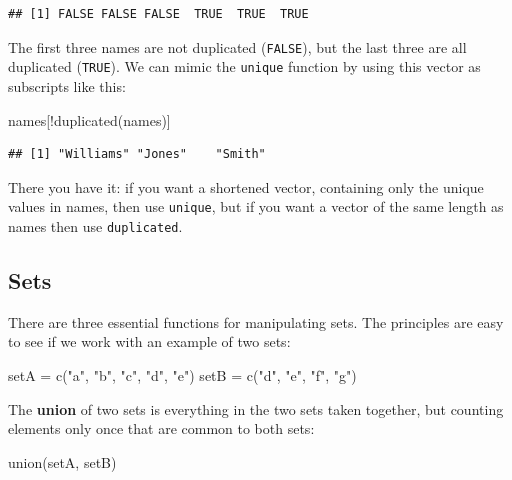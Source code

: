 \documentclass[
]{book}
\newenvironment{Shaded}{\begin{snugshade}}{\end{snugshade}}
\newcommand{\FunctionTok}[1]{\textcolor[rgb]{0.00,0.00,0.00}{#1}}
\newcommand{\NormalTok}[1]{#1}
\newcommand{\OtherTok}[1]{\textcolor[rgb]{0.56,0.35,0.01}{#1}}
\newcommand{\SpecialCharTok}[1]{\textcolor[rgb]{0.00,0.00,0.00}{#1}}
\newcommand{\StringTok}[1]{\textcolor[rgb]{0.31,0.60,0.02}{#1}}
\theoremstyle{definition}
\theoremstyle{definition}
\theoremstyle{definition}
\theoremstyle{definition}
\theoremstyle{remark}
\begin{document}
\begin{verbatim}
## [1] FALSE FALSE FALSE  TRUE  TRUE  TRUE
\end{verbatim}

The first three names are not duplicated (\texttt{FALSE}), but the last three are all duplicated (\texttt{TRUE}). We can mimic the \texttt{unique} function by using this vector as subscripts like this:

\begin{Shaded}
\begin{Highlighting}[]
\NormalTok{names[}\SpecialCharTok{!}\FunctionTok{duplicated}\NormalTok{(names)]}
\end{Highlighting}
\end{Shaded}

\begin{verbatim}
## [1] "Williams" "Jones"    "Smith"
\end{verbatim}

There you have it: if you want a shortened vector, containing only the unique values in names, then use \texttt{unique}, but if you want a vector of the same length as names then use \texttt{duplicated}.

\hypertarget{sets}{%
\subsection{Sets}\label{sets}}

There are three essential functions for manipulating sets. The principles are easy to see if we work with an example of two sets:

\begin{Shaded}
\begin{Highlighting}[]
\NormalTok{setA }\OtherTok{=} \FunctionTok{c}\NormalTok{(}\StringTok{"a"}\NormalTok{, }\StringTok{"b"}\NormalTok{, }\StringTok{"c"}\NormalTok{, }\StringTok{"d"}\NormalTok{, }\StringTok{"e"}\NormalTok{)}
\NormalTok{setB }\OtherTok{=} \FunctionTok{c}\NormalTok{(}\StringTok{"d"}\NormalTok{, }\StringTok{"e"}\NormalTok{, }\StringTok{"f"}\NormalTok{, }\StringTok{"g"}\NormalTok{)}
\end{Highlighting}
\end{Shaded}

The \textbf{union} of two sets is everything in the two sets taken together, but counting elements only once that are common to both sets:

\begin{Shaded}
\begin{Highlighting}[]
\FunctionTok{union}\NormalTok{(setA, setB)}
\end{Highlighting}
\end{Shaded}
\end{document}
